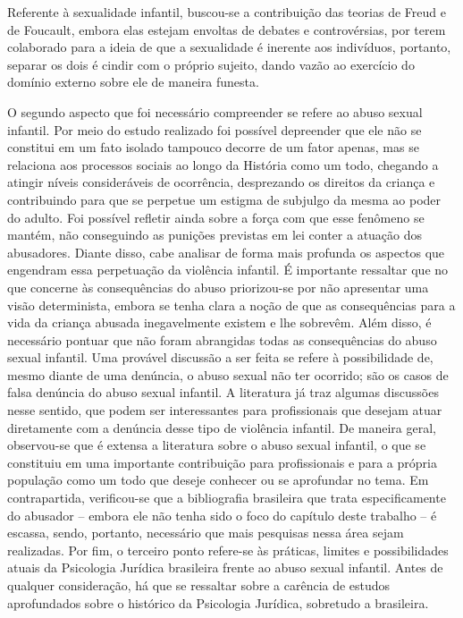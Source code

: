 Referente à sexualidade infantil, buscou-se a contribuição das teorias de Freud e de Foucault, embora elas estejam envoltas de debates e controvérsias, por terem colaborado para a ideia de que a sexualidade é inerente aos indivíduos, portanto, separar os dois é cindir com o próprio sujeito, dando vazão ao exercício do domínio externo sobre ele de maneira funesta.

O segundo aspecto que foi necessário compreender se refere ao abuso sexual infantil. Por meio do estudo realizado foi possível depreender que ele não se constitui em um fato isolado tampouco decorre de um fator apenas, mas se relaciona aos processos sociais ao longo da História como um todo, chegando a atingir níveis consideráveis de ocorrência, desprezando os direitos da criança e contribuindo para que se perpetue um estigma de subjulgo da mesma ao poder do adulto. Foi possível refletir ainda sobre a força com que esse fenômeno se mantém, não conseguindo as punições previstas em lei conter a atuação dos abusadores. Diante disso, cabe analisar de forma mais profunda os aspectos que engendram essa perpetuação da violência infantil.
É importante ressaltar que no que concerne às consequências do abuso priorizou-se por não apresentar uma visão determinista, embora se tenha clara a noção de que as consequências para a vida da criança abusada inegavelmente existem e lhe sobrevêm. Além disso, é necessário pontuar que não foram abrangidas todas as consequências do abuso sexual infantil.
Uma provável discussão a ser feita se refere à possibilidade de, mesmo diante de uma denúncia, o abuso sexual não ter ocorrido; são os casos de falsa denúncia do abuso sexual infantil. A literatura já traz algumas discussões nesse sentido, que podem ser interessantes para profissionais que desejam atuar diretamente com a denúncia desse tipo de violência infantil.
De maneira geral, observou-se que é extensa a literatura sobre o abuso sexual infantil, o que se constituiu em uma importante contribuição para profissionais e para a própria população como um todo que deseje conhecer ou se aprofundar no tema. Em contrapartida, verificou-se que a bibliografia brasileira que trata especificamente do abusador -- embora ele não tenha sido o foco do capítulo deste trabalho -- é escassa, sendo, portanto, necessário que mais pesquisas nessa área sejam realizadas.
Por fim, o terceiro ponto  refere-se às práticas, limites e possibilidades atuais da Psicologia Jurídica brasileira frente ao abuso sexual infantil. Antes de qualquer consideração, há que se ressaltar sobre a carência de estudos aprofundados sobre o histórico da Psicologia Jurídica, sobretudo a brasileira. 
